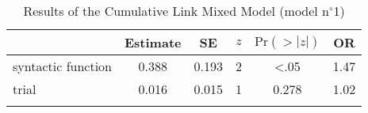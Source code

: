 \begin{table}
\begin{tabular}{l S[table-format=1.3] S[table-format=1.3] c S[table-format=<1.3] S[table-format=1.2]}
  \lsptoprule
                     & {Estimate} & {SE} & {$z$} & {$\text{Pr}(>|z|)$} & {OR} \\ 
  \midrule
  syntactic function & 0.388 & 0.193 & 2 & <.05 & 1.47 \\ 
  trial              & 0.016 & 0.015 & 1 & 0.278 & 1.02 \\ 
   \lspbottomrule
\end{tabular}
\caption{Results of the Cumulative Link Mixed Model (model n$^{\circ}$1)}
\label{tab:exp15-m1}
\end{table}
